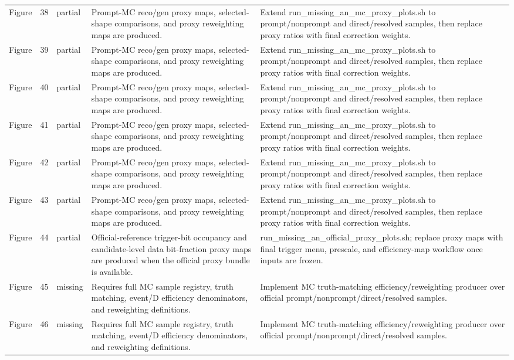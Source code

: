 \documentclass[11pt]{article}
\begin{document}
\begin{longtable}{lll p{} p{}}
Figure & 38 & partial & Prompt-MC reco/gen proxy maps, selected-shape comparisons, and proxy reweighting maps are produced. & Extend run\_missing\_an\_mc\_proxy\_plots.sh to prompt/nonprompt and direct/resolved samples, then replace proxy ratios with final correction weights. \\
Figure & 39 & partial & Prompt-MC reco/gen proxy maps, selected-shape comparisons, and proxy reweighting maps are produced. & Extend run\_missing\_an\_mc\_proxy\_plots.sh to prompt/nonprompt and direct/resolved samples, then replace proxy ratios with final correction weights. \\
Figure & 40 & partial & Prompt-MC reco/gen proxy maps, selected-shape comparisons, and proxy reweighting maps are produced. & Extend run\_missing\_an\_mc\_proxy\_plots.sh to prompt/nonprompt and direct/resolved samples, then replace proxy ratios with final correction weights. \\
Figure & 41 & partial & Prompt-MC reco/gen proxy maps, selected-shape comparisons, and proxy reweighting maps are produced. & Extend run\_missing\_an\_mc\_proxy\_plots.sh to prompt/nonprompt and direct/resolved samples, then replace proxy ratios with final correction weights. \\
Figure & 42 & partial & Prompt-MC reco/gen proxy maps, selected-shape comparisons, and proxy reweighting maps are produced. & Extend run\_missing\_an\_mc\_proxy\_plots.sh to prompt/nonprompt and direct/resolved samples, then replace proxy ratios with final correction weights. \\
Figure & 43 & partial & Prompt-MC reco/gen proxy maps, selected-shape comparisons, and proxy reweighting maps are produced. & Extend run\_missing\_an\_mc\_proxy\_plots.sh to prompt/nonprompt and direct/resolved samples, then replace proxy ratios with final correction weights. \\
Figure & 44 & partial & Official-reference trigger-bit occupancy and candidate-level data bit-fraction proxy maps are produced when the official proxy bundle is available. & run\_missing\_an\_official\_proxy\_plots.sh; replace proxy maps with final trigger menu, prescale, and efficiency-map workflow once inputs are frozen. \\
Figure & 45 & missing & Requires full MC sample registry, truth matching, event/D efficiency denominators, and reweighting definitions. & Implement MC truth-matching efficiency/reweighting producer over official prompt/nonprompt/direct/resolved samples. \\
Figure & 46 & missing & Requires full MC sample registry, truth matching, event/D efficiency denominators, and reweighting definitions. & Implement MC truth-matching efficiency/reweighting producer over official prompt/nonprompt/direct/resolved samples. \\

\end{longtable}
\end{document}
